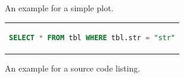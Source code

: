 \documentclass[headsepline,footsepline,footinclude=false,oneside,fontsize=11pt,paper=a4,listof=totoc,bibliography=totoc]{scrbook} %
\begin{document}
\begin{figure}[htpb]
  \centering

  \exampleA
  \exampleB
  \caption[Example plot]{An example for a simple plot.}\label{fig:sample-plot}
\end{figure}

\begin{figure}[htpb]
  \centering
  \begin{tabular}{c}
  \begin{lstlisting}[language=SQL]
    SELECT * FROM tbl WHERE tbl.str = "str"
  \end{lstlisting}
  \end{tabular}
  \caption[Example listing]{An example for a source code listing.}\label{fig:sample-listing}
\end{figure}

\appendix{}

\listoffigures{}
\listoftables{}
\printbibliography{}
\end{document}
